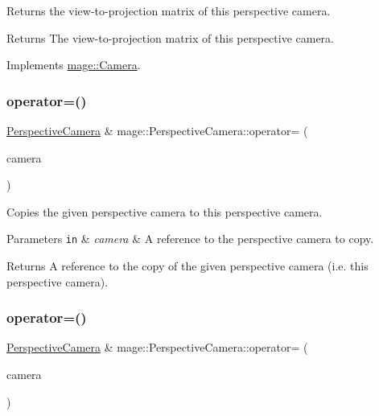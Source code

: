 Returns the view-\/to-\/projection matrix of this perspective camera.

\begin{DoxyReturn}{Returns}
The view-\/to-\/projection matrix of this perspective camera. 
\end{DoxyReturn}


Implements \hyperlink{classmage_1_1_camera_a1f5206864cf18b5548219492556df5d2}{mage\+::\+Camera}.

\hypertarget{classmage_1_1_perspective_camera_a0fe5ef8bd4d28efa8e4851a8055b6fa5}{}\label{classmage_1_1_perspective_camera_a0fe5ef8bd4d28efa8e4851a8055b6fa5} 
\subsubsection{\texorpdfstring{operator=()}{operator=()}\hspace{0.1cm}{\footnotesize\ttfamily [1/2]}}
{\footnotesize\ttfamily \hyperlink{classmage_1_1_perspective_camera}{Perspective\+Camera} \& mage\+::\+Perspective\+Camera\+::operator= (\begin{DoxyParamCaption}\item[{const \hyperlink{classmage_1_1_perspective_camera}{Perspective\+Camera} \&}]{camera }\end{DoxyParamCaption})\hspace{0.3cm}{\ttfamily [default]}}

Copies the given perspective camera to this perspective camera.


\begin{DoxyParams}[1]{Parameters}
\mbox{\tt in}  & {\em camera} & A reference to the perspective camera to copy. \\
\hline
\end{DoxyParams}
\begin{DoxyReturn}{Returns}
A reference to the copy of the given perspective camera (i.\+e. this perspective camera). 
\end{DoxyReturn}
\hypertarget{classmage_1_1_perspective_camera_a338c75900237f3623b31b0231a5f5782}{}\label{classmage_1_1_perspective_camera_a338c75900237f3623b31b0231a5f5782} 
\subsubsection{\texorpdfstring{operator=()}{operator=()}\hspace{0.1cm}{\footnotesize\ttfamily [2/2]}}
{\footnotesize\ttfamily \hyperlink{classmage_1_1_perspective_camera}{Perspective\+Camera} \& mage\+::\+Perspective\+Camera\+::operator= (\begin{DoxyParamCaption}\item[{\hyperlink{classmage_1_1_perspective_camera}{Perspective\+Camera} \&\&}]{camera }\end{DoxyParamCaption})\hspace{0.3cm}{\ttfamily [default]}}

